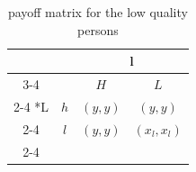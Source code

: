 \documentclass{article}
\begin{document}
	\begin{table}[h]
	\begin{center}
                \setlength{\extrarowheight}{2pt}
                \begin{tabular}{*{4}{c|}}
                  \multicolumn{2}{c}{} & \multicolumn{2}{c}{l}\\\cline{3-4}
                  \multicolumn{1}{c}{} &  & $H$  & $L$ \\\cline{2-4}
                  \multirow{2}*{L}  & $h$ & $(y,y)$ & $(y,y)$\\\cline{2-4}
                  & $l$ & $(y,y)$ & $(x_l, x_l)$ \\\cline{2-4}
                \end{tabular}
        \end{center}
        \caption{payoff matrix for the low quality persons}
  	\end{table}
	
\end{document}
